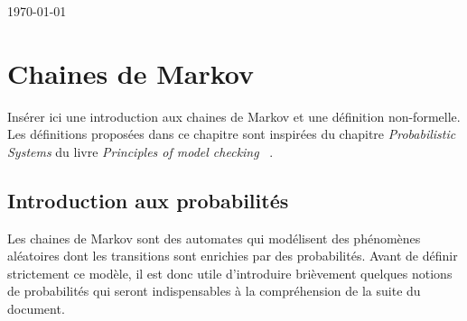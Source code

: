 \documentclass[12pt,a4paper]{report}
\theoremstyle{definition}%
\theoremstyle{remark}
\begin{document}
\begin{titlepage}
	
	\vspace{6.3cm}
	{\large \today}\\[3cm] %
	
	
	
	
	\vfill %
	
\end{titlepage}

\newpage
\tableofcontents
\listoftheorems[ignoreall,show={definition,example}]
\newpage

\chapter{Chaines de Markov}

Insérer ici une introduction aux chaines de Markov et une définition non-formelle.\\

Les définitions proposées dans ce chapitre sont inspirées du chapitre \textit{Probabilistic Systems} du livre \textit{Principles of model checking} ~\cite{DBLP:books/daglib/0020348}.

\section{Introduction aux probabilités}
Les chaines de Markov sont des automates qui modélisent des phénomènes aléatoires dont les transitions sont enrichies par des probabilités. Avant de définir strictement ce modèle, il est donc utile d'introduire brièvement quelques notions de probabilités qui seront indispensables à la compréhension de la suite du document.
\end{document}
